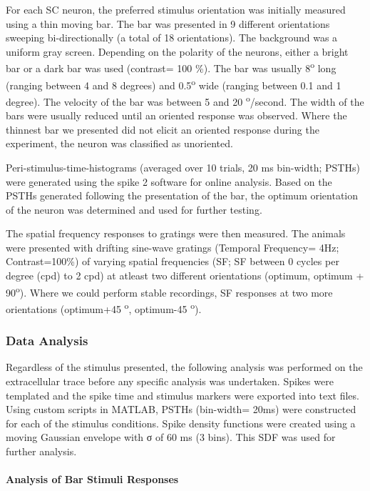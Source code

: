For each SC neuron, the preferred stimulus orientation was initially
measured using a thin moving bar. The bar was presented in 9 different
orientations sweeping bi-directionally (a total of 18 orientations). The
background was a uniform gray screen. Depending on the polarity of the
neurons, either a bright bar or a dark bar was used (contrast= 100 \%).
The bar was usually 8\textsuperscript{o} long (ranging between 4 and 8
degrees) and 0.5\textsuperscript{o} wide (ranging between 0.1 and 1
degree). The velocity of the bar was between 5 and 20
\textsuperscript{o}/second. The width of the bars were usually reduced
until an oriented response was observed. Where the thinnest bar we
presented did not elicit an oriented response during the experiment, the
neuron was classified as unoriented.

Peri-stimulus-time-histograms (averaged over 10 trials, 20 ms bin-width;
PSTHs) were generated using the spike 2 software for online analysis.
Based on the PSTHs generated following the presentation of the bar, the
optimum orientation of the neuron was determined and used for further
testing.

The spatial frequency responses to gratings were then measured. The
animals were presented with drifting sine-wave gratings (Temporal
Frequency= 4Hz; Contrast=100\%) of varying spatial frequencies (SF; SF
between 0 cycles per degree (cpd) to 2 cpd) at atleast two different
orientations (optimum, optimum + 90\textsuperscript{o}). Where we could
perform stable recordings, SF responses at two more orientations
(optimum+45 \textsuperscript{o}, optimum-45 \textsuperscript{o}).
	
	
	\subsubsection{Data Analysis}
	
	Regardless of the stimulus presented, the following analysis was performed on the extracellular trace before any specific analysis was undertaken. Spikes were templated and the spike time and stimulus markers were exported into text files. Using custom scripts in MATLAB, PSTHs (bin-width= 20ms) were constructed for each of the stimulus conditions.  Spike density functions were created using a moving Gaussian envelope with σ of 60 ms (3 bins). This SDF was used for further analysis.
	
	\paragraph{Analysis of Bar Stimuli Responses}
	
